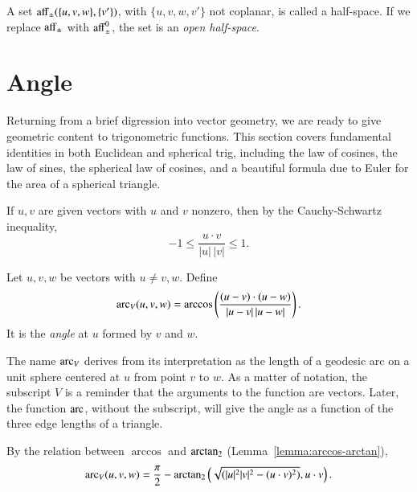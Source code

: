 \begin{definition} A set ${\operatorname{aff}}_{\pm}(\{u,v,w\},\{v'\})$,
with $\{u,v,w,v'\}$ not coplanar, is called a half-space.  If
we replace ${\operatorname{aff}}_{\pm}$ with ${\operatorname{aff}}_{\pm}^0$, the set is an
{\it open half-space}.
\end{definition}

\section{Angle}

Returning from a brief digression into vector geometry, we
are ready to give geometric content to trigonometric functions.
This section covers fundamental identities
in both Euclidean and spherical trig, including the law
of cosines, the law of sines, the spherical law of cosines, 
and a beautiful formula due to Euler for
the area of a spherical triangle.

If $u,v$ are given vectors with $u$ and $v$ nonzero, then by the
Cauchy-Schwartz inequality,
    $$-1 \le \frac{u\cdot v}{|u|\,|v|} \le 1.$$

\begin{definition}\label{def:angle}
Let $u,v,w$ be vectors with $u\ne v,w$.
Define
    $$
    \operatorname{arc}_V(u,v,w) = \arccos\left(\frac{(u-v)\cdot (u-w)}{|u-v|\,|u-w|}\right).
    $$
It is the {\it angle} at $u$ formed by $v$ and $w$.
\end{definition}

The name $\operatorname{arc}_V$ derives from its interpretation as the
length of a geodesic arc on a unit sphere
centered at $u$ from point $v$ to $w$.
As a matter of notation, the subscript $V$ is a reminder that
the arguments to the function are vectors.  Later, the function
$\operatorname{arc}$, without the subscript, will give the angle as a function
of the three edge lengths of a triangle.




By the relation between $\arccos$ and ${\operatorname{arctan_2}}$
(Lemma~\ref{lemma:arccos-arctan}), %
    \begin{equation}\label{eqn:angle}
    \operatorname{arc}_V(u,v,w) = \frac{\pi}2 - {\operatorname{arctan_2}}\left ({\sqrt{(|u|^2|v|^2 -
    (u\cdot v)^2)}}, {u\cdot v}\right).
    \end{equation}

